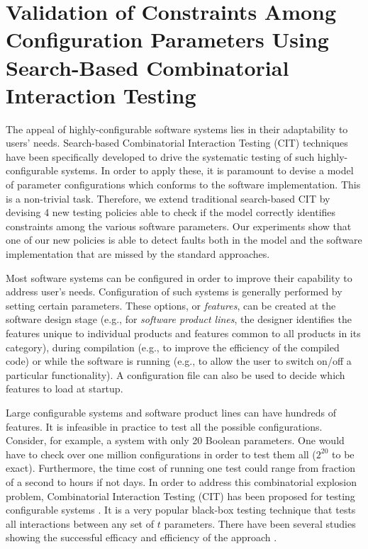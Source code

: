 \section{Validation of Constraints Among Configuration Parameters Using Search-Based Combinatorial Interaction Testing}\label{sec:Gargantini16validation}
	The appeal of highly-configurable software systems lies in their adaptability to users' needs. 
	Search-based Combinatorial Interaction Testing (CIT) techniques have been specifically developed to drive the systematic testing of such highly-configurable systems. In order to apply these, it is paramount to devise a model of parameter configurations which conforms to the software implementation. This is a non-trivial task. Therefore, we extend traditional search-based CIT by devising 4 new testing policies able to check if the model correctly identifies constraints among the various software parameters. Our experiments show that 
	one of our new policies is able to detect faults both in the model and the software implementation that are missed by the standard approaches.
	
	
	Most software systems can be configured in order to improve their capability to address user's needs. Configuration of such systems is generally performed by setting certain parameters. These options, or \emph{features},  can be created at the software design stage (e.g., for \emph{software product lines}, the designer identifies the features unique to individual products and features common to all products in its category), during compilation  (e.g., to improve the efficiency of the compiled code) or while the software is running (e.g., to allow the user to switch on/off a particular functionality). 
	A configuration file can also be used to decide which features to load at startup.
	
	Large configurable systems and software product lines can have hundreds of features. It is infeasible in practice to test all the possible configurations.
	Consider, for example, a system with only 20 Boolean parameters. One would have to check over one million configurations in order to test them all ($2^{20}$ to be exact). Furthermore, the time cost of running one test could range from fraction of a second to hours if not days. In order to address this combinatorial explosion problem, Combinatorial Interaction Testing (CIT) has been proposed for testing configurable systems \cite{CohenTSE08}. It is a very popular black-box testing technique that tests all interactions between any set of $t$ parameters. There have been several studies showing the successful efficacy and efficiency of the approach \cite{Kuhn06:pseudo,KuhnTSE04,Petke15:practical}.%
	
